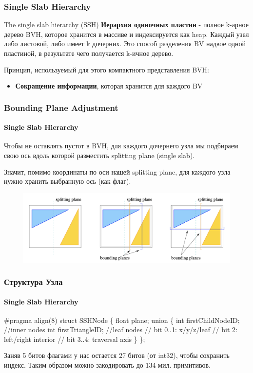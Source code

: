 \documentclass{beamer}
\begin{document}
\begin{frame}
    \frametitle{Single Slab Hierarchy}
    \begin{block}{The single slab hierarchy (SSH)}
        \textbf{Иерархия одиночных пластин} - полное k-арное дерево BVH, которое хранится в массиве
        и индексируется как heap.
        Каждый узел либо листовой, либо имеет k дочерних.
        Это способ разделения BV надвое одной пластиной,
        в результате чего получается k-ичное дерево.
    \end{block}

    Принцип, используемый для этого компактного представления BVH:
    \begin{itemize}
        \item
            \textbf{Сокращение информации}, которая хранится для каждого BV
    \end{itemize}

\end{frame}

\begin{frame}
    \frametitle{Bounding Plane Adjustment}
    \framesubtitle{Single Slab Hierarchy}
    Чтобы не оставлять пустот в BVH, для каждого дочернего узла мы подбираем
    свою ось вдоль которой разместить splitting plane (single slab).

    Значит, помимо координаты по оси нашей splitting plane, для каждого узла нужно
    хранить выбранную ось (как флаг).
    \begin{figure}
        \includegraphics[keepaspectratio, width=\textwidth]{res/splitting_ssh.png}
    \end{figure}
\end{frame}

\begin{frame}[fragile]
    \frametitle{Структура Узла}
    \framesubtitle{Single Slab Hierarchy}

    \begin{semiverbatim}
        #pragma align(8)
        struct SSHNode \{
            float plane;
            union \{
                int firstChildNodeID; //inner nodes
                int firstTriangleID; //leaf nodes
                // bit 0..1: x/y/z/leaf
                // bit 2: left/right interior
                // bit 3..4: traversal axis
            \}
        \};
    \end{semiverbatim}
    Заняв 5 битов флагами у нас остается 27 битов (от int32),
    чтобы сохранить индекс.
    Таким образом можно закодировать до 134 мил. примитивов.

\end{frame}
\end{document}
